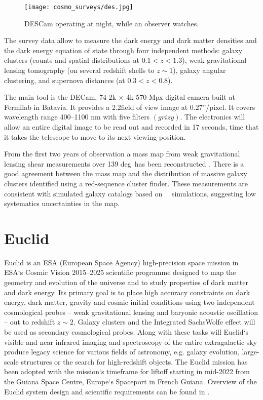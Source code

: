 \begin{figure}[ht]
    \centering
    \texttt{[image: cosmo\_surveys/des.jpg]}
    \caption{DESCam operating at night, while an observer watches.}
    \label{fig:des}
\end{figure}
The survey data allow to measure the dark energy and dark matter densities and the dark energy equation of state through four independent methods: galaxy clusters (counts and spatial distributions at $0.1<z<1.3$), weak gravitational lensing tomography (on several redshift shells to $z\sim1$), galaxy angular clustering, and supernova distances (at $0.3<z<0.8$).

The main tool is the DECam, 74 2k $\times$ 4k 570 Mpx digital camera built at Fermilab in Batavia. It provides a 2.2\textdegree field of view image at 0.27''/pixel. It covers wavelength range 400--1100 nm with five filters $(grizy)$. The electronics will allow an entire digital image to be read out and recorded in 17 seconds, time that it takes the telescope to move to its next viewing position.

From the first two years of observation a mass map from weak gravitational lensing shear measurements over 139 deg\sq\ has been reconstructed \cite{DES_mass}. There is a good agreement between the mass map and the distribution of massive galaxy clusters identified using a red-sequence cluster finder. These measurements are consistent with simulated galaxy catalogs based on \LCDM\ \nbody\ simulations, suggesting low systematics uncertainties in the map.


\section{Euclid}
Euclid is an ESA (European Space Agency) high-precision space mission in ESA`s Cosmic Vision 2015--2025 scientific programme designed to map the geometry and evolution of the universe and to study properties of dark matter and dark energy. Its primary goal is to place high accuracy constraints on dark energy, dark matter, gravity and cosmic initial conditions using two independent cosmological probes -- weak gravitational lensing and baryonic acoustic oscillation -- out to redshift $z\sim2$. Galaxy clusters and the Integrated SachsWolfe effect will be used as secondary cosmological probes. Along with these tasks will Euclid`s visible and near infrared imaging and spectroscopy of the entire extragalactic sky produce legacy science for various fields of astronomy, e.g. galaxy evolution, large-scale structures or the search for high-redshift objects. The Euclid mission has been adopted with the mission`s timeframe for liftoff starting in mid-2022 from the Guiana Space Centre, Europe`s Spaceport in French Guiana. Overview of the Euclid system design and scientific requirements can be found in \cite{2011arXiv1110.3193L}.


